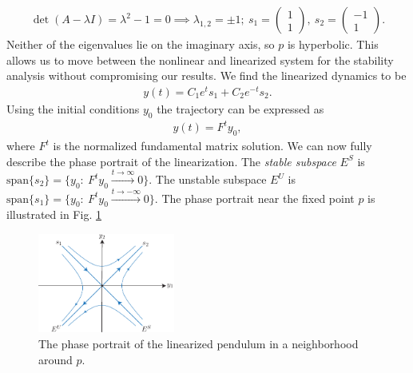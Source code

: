 \begin{ex}
\begin{align}
		\det({A} - \lambda {I} ) = \lambda^2 -1 = 0 \implies \lambda_{1,2} = \pm 1;\ {s_1} =
		\begin{pmatrix}
			1 \\ 1
		\end{pmatrix}
		,\ {s_2} =
		\begin{pmatrix}
			-1 \\ 1
		\end{pmatrix}.
	\end{align}
	Neither of the eigenvalues lie on the imaginary axis, so $p$ is hyperbolic. This allows us to move between the nonlinear and linearized system for the stability analysis without compromising our results. We find the linearized dynamics to be
	\begin{align}
		{y} (t) = C_1 e^{t} {s_1}  + C_2 e^{-t}{s_2}.
	\end{align}
	Using the initial conditions $y_0$ the trajectory can be expressed as
	\begin{align}
		y(t) =  F^{t}{y_0}, 
	\end{align}
	where $F^{t}$ is the normalized fundamental matrix solution. We can now fully describe the phase portrait of the linearization. The \emph{stable subspace} $E^{S}$ is $ \textrm{span} \{{s_2} \} = \{{y_0} :\ F^{t}{y_0} \xrightarrow{t \to \infty} 0 \} $. The unstable subspace $E^{U}$ is $ \textrm{span} \{{s_1}\} = \{{y_0} : \ F^{t}{y_0} \xrightarrow{t \to - \infty }0\} $. The phase portrait near the fixed point $p$ is illustrated in Fig. \ref{fig:pend_phase_p}
\begin{figure}[h!]
	\centering
	\includegraphics[width=0.4\textwidth]{figures/ch2/17pend_phase_p}
	\caption{The phase portrait of the linearized pendulum in a neighborhood around ${p} $.}
	\label{fig:pend_phase_p}
\end{figure}


\end{ex}
